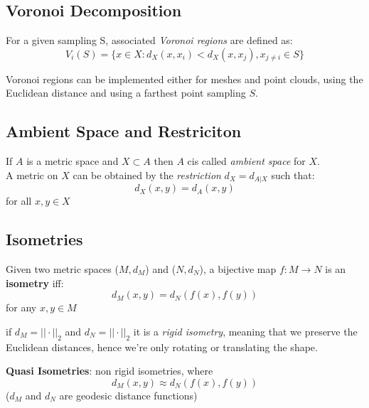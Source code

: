 \documentclass[11pt]{article}
\begin{document}
\subsection{Voronoi Decomposition}
For a given sampling S, associated \textit{Voronoi regions} are defined as:
\begin{equation}
	V_i(S) = \{x \in X : d_X(x, x_i) < d_X(x, x_j), x_{j \neq i} \in S\}
\end{equation}

Voronoi regions can be implemented either for meshes and point clouds, using the Euclidean distance and using a farthest point sampling $S$.

\subsection{Ambient Space and Restriciton}
If $A$ is a metric space and $X \subset A$ then $A$ cis called \textit{ambient space} for $X$.\\
A metric on $X$ can be obtained by the \textit{restriction} $d_X = d_{A|X}$ such that:
\begin{equation}
	d_X(x,y) = d_A(x,y)
\end{equation}
for all $x,y \in X$

\subsection{Isometries}
Given two metric spaces ($M,d_M$) and ($N,d_N$), a bijective map $f:M \rightarrow N$ is an \textbf{isometry} iff:
\begin{equation}
	d_M(x,y) = d_N(f(x),f(y))
\end{equation}
for any $x,y \in M$

if $d_M = ||\cdot||_2$ and $d_N = ||\cdot||_2$ it is a \textit{rigid isometry}, meaning that we preserve the Euclidean distances, hence we're only rotating or translating the shape.

\textbf{Quasi Isometries}: non rigid isometries, where 
\begin{equation}
	d_M(x,y) \approx d_N(f(x), f(y))
\end{equation}
($d_M$ and $d_N$ are geodesic distance functions)
\end{document}
